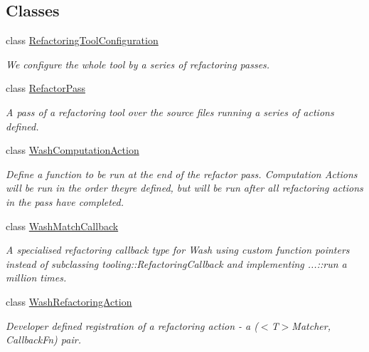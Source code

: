 \subsection*{Classes}
\begin{DoxyCompactItemize}
\item 
class \mbox{\hyperlink{classws2st_1_1refactor_1_1RefactoringToolConfiguration}{Refactoring\+Tool\+Configuration}}
\begin{DoxyCompactList}\small\item\em We configure the whole tool by a series of refactoring passes. \end{DoxyCompactList}\item 
class \mbox{\hyperlink{classws2st_1_1refactor_1_1RefactorPass}{Refactor\+Pass}}
\begin{DoxyCompactList}\small\item\em A pass of a refactoring tool over the source files running a series of actions defined. \end{DoxyCompactList}\item 
class \mbox{\hyperlink{classws2st_1_1refactor_1_1WashComputationAction}{Wash\+Computation\+Action}}
\begin{DoxyCompactList}\small\item\em Define a function to be run at the end of the refactor pass. Computation Actions will be run in the order they\textquotesingle{}re defined, but will be run after all refactoring actions in the pass have completed. \end{DoxyCompactList}\item 
class \mbox{\hyperlink{classws2st_1_1refactor_1_1WashMatchCallback}{Wash\+Match\+Callback}}
\begin{DoxyCompactList}\small\item\em A specialised refactoring callback type for Wash using custom function pointers instead of subclassing tooling\+::\+Refactoring\+Callback and implementing ...\+::run a million times. \end{DoxyCompactList}\item 
class \mbox{\hyperlink{classws2st_1_1refactor_1_1WashRefactoringAction}{Wash\+Refactoring\+Action}}
\begin{DoxyCompactList}\small\item\em Developer defined registration of a refactoring action -\/ a ($<$\+T$>$Matcher, Callback\+Fn) pair. \end{DoxyCompactList}\end{DoxyCompactItemize}
